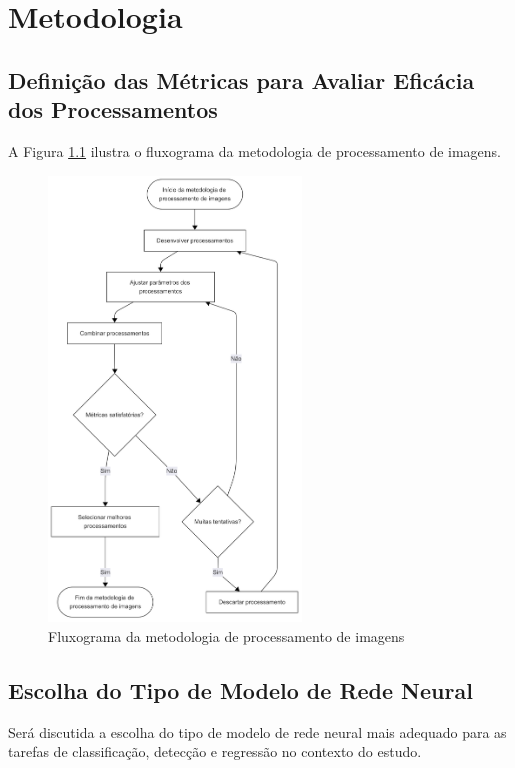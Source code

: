 \chapter{Metodologia}
\section{Definição das Métricas para Avaliar Eficácia dos Processamentos}

A Figura \ref{fig:fluxograma_metodologia} ilustra o fluxograma da metodologia de processamento de imagens.

\begin{figure}[h]
    \centering
    \includegraphics[width=0.6\textwidth]{img/metodologia.png}
    \caption{Fluxograma da metodologia de processamento de imagens}
    \label{fig:fluxograma_metodologia}
\end{figure}

\section{Escolha do Tipo de Modelo de Rede Neural}
Será discutida a escolha do tipo de modelo de rede neural mais adequado para as tarefas de classificação, detecção e regressão no contexto do estudo.


